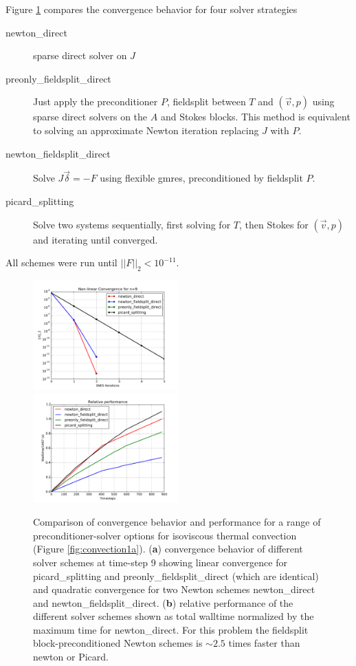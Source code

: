 Figure \ref{fig:isoviscous_conv_perf} compares the
convergence behavior for four solver strategies 
\begin{description}
\item[newton\_direct]  sparse direct solver on $J$
\item[preonly\_fieldsplit\_direct] Just apply the  preconditioner $P$,
  fieldsplit between $T$ and
  $(\vec{v},p)$ using sparse direct
  solvers on the $A$ and Stokes blocks.  This method is equivalent to solving an approximate Newton
  iteration replacing $J$ with $P$.
\item[newton\_fieldsplit\_direct]  Solve $J\vec{\delta}=-F$ using
  flexible gmres, preconditioned by fieldsplit $P$.
\item[picard\_splitting] Solve two systems sequentially, first solving
  for $T$, then Stokes for $(\vec{v},p)$ and iterating until converged.
\end{description}
All schemes were run until $||F||_{2}<10^{-11}$.  

\begin{figure}[htb]
  \centering
\includegraphics[width=0.5\textwidth]{figures/Solver_comparison_SNES_convergence_isoviscous.pdf}\hfill{}
\includegraphics[width=0.5\textwidth]{figures/Solver_comparison_Walltime_isoviscous.pdf}\\
\caption{Comparison of convergence behavior and performance for a
  range of preconditioner-solver options for isoviscous thermal
  convection (Figure \ref{fig:convection1a}).  (\textbf{a})
  convergence behavior of different solver schemes at time-step 9
  showing linear convergence for picard\_splitting and
  preonly\_fieldsplit\_direct (which are identical) and quadratic convergence for
  two Newton schemes   newton\_direct and newton\_fieldsplit\_direct. (\textbf{b}) relative
  performance of the different solver schemes shown as total walltime
  normalized by the maximum time for newton\_direct.  For this problem
the fieldsplit block-preconditioned Newton schemes is $\sim2.5$ times
faster than newton or Picard.}
  \label{fig:isoviscous_conv_perf}
\end{figure}

